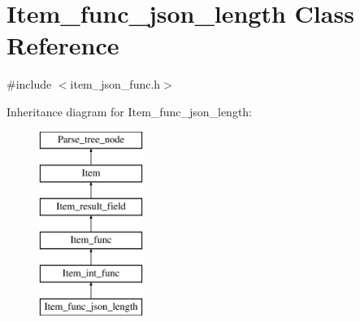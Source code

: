 \hypertarget{classItem__func__json__length}{}\section{Item\+\_\+func\+\_\+json\+\_\+length Class Reference}
\label{classItem__func__json__length}


{\ttfamily \#include $<$item\+\_\+json\+\_\+func.\+h$>$}

Inheritance diagram for Item\+\_\+func\+\_\+json\+\_\+length\+:\begin{figure}[H]
\begin{center}
\leavevmode
\includegraphics[height=6.000000cm]{classItem__func__json__length}
\end{center}
\end{figure}
